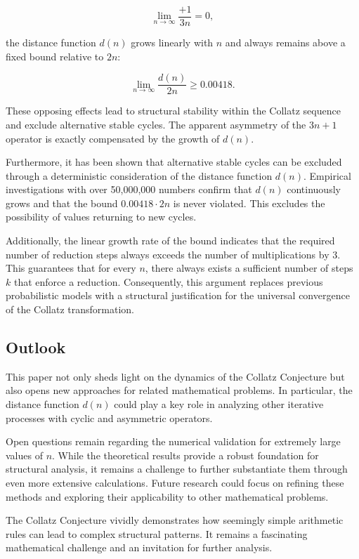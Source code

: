 \documentclass[a4paper,12pt]{article}
\begin{document}
\[
\lim_{n \to \infty} \frac{+1}{3n} = 0,
\]

the distance function \( d(n) \) grows linearly with \( n \) and always remains above a fixed bound relative to \( 2n \):

\[
\lim_{n \to \infty} \frac{d(n)}{2n} \geq 0.00418.
\]

These opposing effects lead to structural stability within the Collatz sequence and exclude alternative stable cycles. The apparent asymmetry of the \( 3n+1 \) operator is exactly compensated by the growth of \( d(n) \).

Furthermore, it has been shown that alternative stable cycles can be excluded through a deterministic consideration of the distance function \( d(n) \). Empirical investigations with over 50,000,000 numbers confirm that \( d(n) \) continuously grows and that the bound \( 0.00418 \cdot 2n \) is never violated. This excludes the possibility of values returning to new cycles.

Additionally, the linear growth rate of the bound indicates that the required number of reduction steps always exceeds the number of multiplications by 3. This guarantees that for every \( n \), there always exists a sufficient number of steps \( k \) that enforce a reduction. Consequently, this argument replaces previous probabilistic models with a structural justification for the universal convergence of the Collatz transformation.

\subsection{Outlook}

This paper not only sheds light on the dynamics of the Collatz Conjecture but also opens new approaches for related mathematical problems. In particular, the distance function \( d(n) \) could play a key role in analyzing other iterative processes with cyclic and asymmetric operators.

Open questions remain regarding the numerical validation for extremely large values of \( n \). While the theoretical results provide a robust foundation for structural analysis, it remains a challenge to further substantiate them through even more extensive calculations. Future research could focus on refining these methods and exploring their applicability to other mathematical problems.

The Collatz Conjecture vividly demonstrates how seemingly simple arithmetic rules can lead to complex structural patterns. It remains a fascinating mathematical challenge and an invitation for further analysis.
\end{document}
